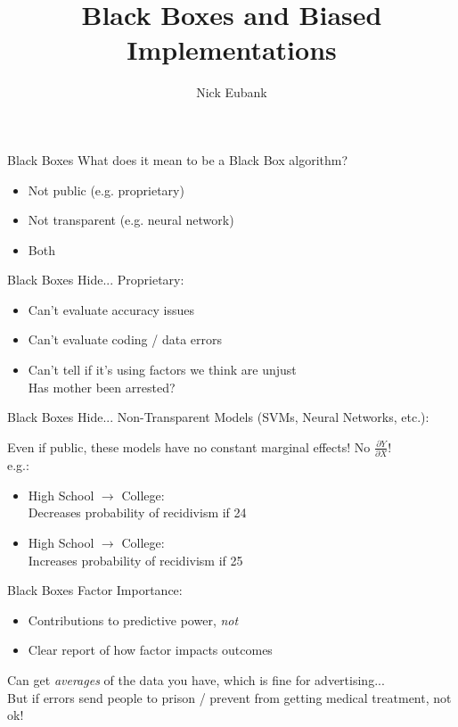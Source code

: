 \documentclass[11pt]{beamer}
\title{Black Boxes and Biased Implementations}
\author{\small Nick Eubank}
\date{\vspace*{.3in} \date}
\begin{document}
\begin{frame}
\maketitle
\end{frame}

\begin{frame}[c]{Black Boxes}
What does it mean to be a Black Box algorithm?
\begin{itemize}
    \pause \item Not public (e.g. proprietary)
    \pause \item Not transparent (e.g. neural network)
    \pause \item Both
\end{itemize}
\end{frame}

\begin{frame}[c]{Black Boxes Hide...}
Proprietary:
\begin{itemize}
    \pause \item Can't evaluate accuracy issues
    \pause \item Can't evaluate coding / data errors
    \pause \item Can't tell if it's using factors we think are unjust \\
    Has mother been arrested?
\end{itemize}
\end{frame}


\begin{frame}[c]{Black Boxes Hide...}
Non-Transparent Models (SVMs, Neural Networks, etc.):

Even if public, these models have no constant marginal effects!
\vspace{0.1cm}
{\Large No $\frac{\partial Y}{\partial X}$!}\\
\vspace{0.1cm}
e.g.:
\begin{itemize}
    \item High School $\rightarrow$ College: \\
    Decreases probability of recidivism if 24
    \item High School $\rightarrow$ College: \\
    Increases probability of recidivism if 25
\end{itemize}
\end{frame}

\begin{frame}[c]{Black Boxes}
Factor Importance:
\begin{itemize}
    \item Contributions to predictive power, \emph{not}
    \pause \item Clear report of \alert{how} factor impacts outcomes
\end{itemize}
\pause Can get \emph{averages} of the data you have, which is fine for advertising...\\
But if errors send people to prison / prevent from getting medical treatment, not ok!
\end{frame}
\end{document}

